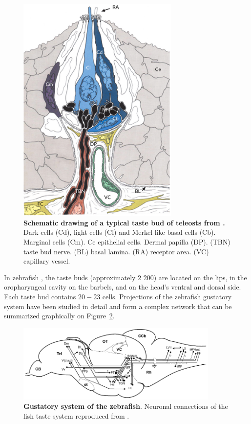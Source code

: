     \begin{figure}[h]
      \centering
      \includegraphics[width=8cm]{part_2/assets/gustatory_schematic.png}
      \caption{\textbf{Schematic drawing of a typical taste bud of teleosts from \cite{hansen2002taste}.} Dark cells (Cd), light cells (Cl) and Merkel‐like basal cells (Cb). Marginal cells (Cm). Ce epithelial cells. Dermal papilla (DP). (TBN) taste bud nerve. (BL) basal lamina. (RA) receptor area. (VC) capillary vessel.}
      \label{gustatory_schematic}
    \end{figure}

    In zebrafish \cite{ohkubo2005distribution}, the taste buds (approximately 2 200) are located on the lips, in the oropharyngeal cavity on the barbels, and on the head's ventral and dorsal side. Each taste bud contains $20 - 23$ cells. Projections of the zebrafish gustatory system have been studied in detail \cite{yanez2017gustatory} and form a complex network that can be summarized graphically on Figure~\ref{gustatory_connection_schematic}.

    \begin{figure}[h]
      \centering
      \includegraphics[width=10cm]{part_2/assets/gustatory_connection_schematic.png}
      \caption{\textbf{Gustatory system of the zebrafish}. Neuronal connections of the fish taste system reproduced from \cite{yanez2017gustatory}.}
      \label{gustatory_connection_schematic}
    \end{figure}

